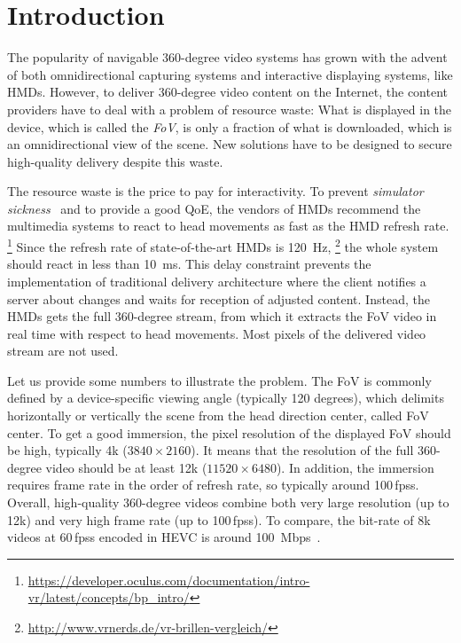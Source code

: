 \section{Introduction}
\label{sec:introduction}


The popularity of navigable 360-degree video systems
has grown with the advent of both omnidirectional capturing systems
and interactive displaying
systems, like \acp{HMD}.
However, to deliver 360-degree video content on the Internet, the content providers 
have to deal with a problem of resource waste: What is displayed in the device,
which is called the \textit{\ac{FoV}}, is only a fraction of what is downloaded, which is an omnidirectional view of the scene.
New solutions have to be designed to secure high-quality delivery despite this waste.

The resource waste is the price to pay for interactivity.
To prevent \emph{simulator sickness}~\cite{moss2011characteristics}
and to provide a good \ac{QoE}, the vendors of \acp{HMD} recommend the multimedia
systems to react
to head movements as fast as the \ac{HMD}
refresh rate.%
\footnote{\url{https://developer.oculus.com/documentation/intro-vr/latest/concepts/bp_intro/}}
Since the refresh rate of
state-of-the-art \acp{HMD} is \SI{120}{Hz},%
\footnote{\url{http://www.vrnerds.de/vr-brillen-vergleich/}}
the whole system should react in less than
\SI{10}{ms}. This delay constraint prevents the implementation of traditional delivery
architecture where the client notifies a server about changes and waits for reception
of adjusted content. Instead, the \acp{HMD} gets the full 360-degree stream, from which
it extracts the \ac{FoV} video in real time with respect to head movements. Most pixels
of the delivered video stream are not used.

Let us provide some numbers to illustrate the problem.
The \ac{FoV} is commonly defined by
a device-specific viewing angle (typically 120 degrees), which delimits horizontally or
vertically the scene from the head direction center, called \ac{FoV} center. To get a good
immersion, the pixel
resolution of
the displayed \ac{FoV} should be high, typically 4k ($3840\times2160$). It means that
the resolution of the full 360-degree video should be at least 12k ($11520\times6480$).
In addition, the immersion requires frame rate in the order of refresh rate, so
typically around 100\,\acp{fps}.
Overall, high-quality 360-degree videos combine both very large resolution (up to 12k)
and very high frame rate (up to 100\,\acp{fps}). To compare, the bit-rate of 8k videos
at 60\,\acp{fps} encoded in \ac{HEVC} is around \SI{100}{Mbps}~\cite{7398367}.



